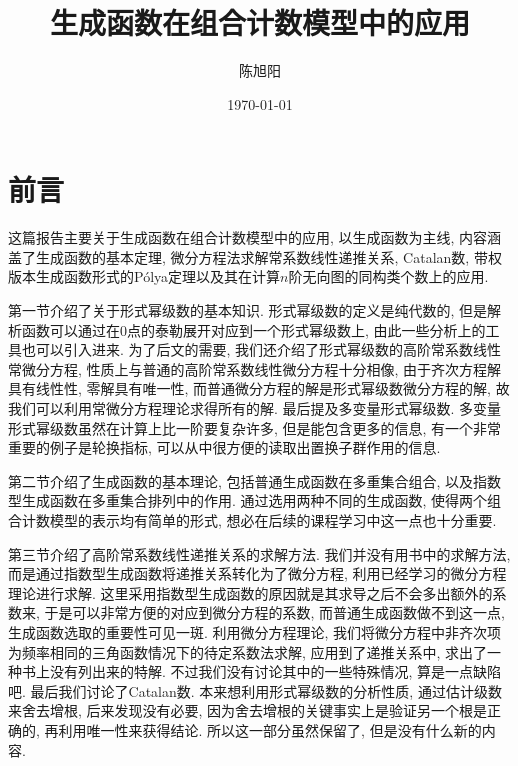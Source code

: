 \documentclass[chinese]{assignment}[2019/10/15]
\title{生成函数在组合计数模型中的应用}
\author{陈旭阳}
\date{\today}
\institute{数学科学学院}
\theoremstyle{plain}
\newcommand{\Polya}{P\'{o}lya}
\begin{document}
    \maketitle
    \tableofcontents
    \clearpage

    \setcounter{section}{-1}
    \section{前言}

    这篇报告主要关于生成函数在组合计数模型中的应用, 以生成函数为主线, 内容涵盖了生成函数的基本定理, 微分方程法求解常系数线性递推关系, Catalan数, 带权版本生成函数形式的\Polya 定理以及其在计算$n$阶无向图的同构类个数上的应用.

    第一节介绍了关于形式幂级数的基本知识. 形式幂级数的定义是纯代数的, 但是解析函数可以通过在0点的泰勒展开对应到一个形式幂级数上, 由此一些分析上的工具也可以引入进来. 为了后文的需要, 我们还介绍了形式幂级数的高阶常系数线性常微分方程, 性质上与普通的高阶常系数线性微分方程十分相像, 由于齐次方程解具有线性性, 零解具有唯一性, 而普通微分方程的解是形式幂级数微分方程的解, 故我们可以利用常微分方程理论求得所有的解. 最后提及多变量形式幂级数. 多变量形式幂级数虽然在计算上比一阶要复杂许多, 但是能包含更多的信息, 有一个非常重要的例子是轮换指标, 可以从中很方便的读取出置换子群作用的信息.

    第二节介绍了生成函数的基本理论, 包括普通生成函数在多重集合组合, 以及指数型生成函数在多重集合排列中的作用. 通过选用两种不同的生成函数, 使得两个组合计数模型的表示均有简单的形式, 想必在后续的课程学习中这一点也十分重要.

    第三节介绍了高阶常系数线性递推关系的求解方法. 我们并没有用书中的求解方法, 而是通过指数型生成函数将递推关系转化为了微分方程, 利用已经学习的微分方程理论进行求解. 这里采用指数型生成函数的原因就是其求导之后不会多出额外的系数来, 于是可以非常方便的对应到微分方程的系数, 而普通生成函数做不到这一点, 生成函数选取的重要性可见一斑. 利用微分方程理论, 我们将微分方程中非齐次项为频率相同的三角函数情况下的待定系数法求解, 应用到了递推关系中, 求出了一种书上没有列出来的特解. 不过我们没有讨论其中的一些特殊情况, 算是一点缺陷吧. 最后我们讨论了Catalan数. 本来想利用形式幂级数的分析性质, 通过估计级数来舍去增根, 后来发现没有必要, 因为舍去增根的关键事实上是验证另一个根是正确的, 再利用唯一性来获得结论. 所以这一部分虽然保留了, 但是没有什么新的内容.
\end{document}
